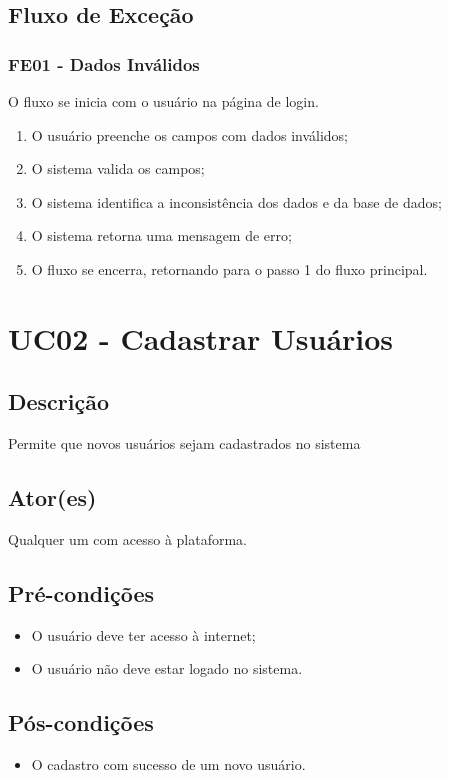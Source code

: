     \subsection{Fluxo de Exceção}
        \subsubsection{FE01 \-- Dados Inválidos}
        O fluxo se inicia com o usuário na página de login.
            \begin{enumerate}
                \item O usuário preenche os campos com dados inválidos;
                \item O sistema valida os campos;
                \item O sistema identifica a inconsistência dos dados e da base de dados;
                \item O sistema retorna uma mensagem de erro;
                \item O fluxo se encerra, retornando para o passo 1 do fluxo principal.
            \end{enumerate}

\section{UC02 \-- Cadastrar Usuários}
    \subsection{Descrição}
        Permite que novos usuários sejam cadastrados no sistema
    \subsection{Ator(es)}
        Qualquer um com acesso à plataforma.
    \subsection{Pré-condições}
        \begin{itemize}
            \item O usuário deve ter acesso à internet;
            \item O usuário não deve estar logado no sistema.
        \end{itemize}
    \subsection{Pós-condições}
        \begin{itemize}
            \item O cadastro com sucesso de um novo usuário.
        \end{itemize}
